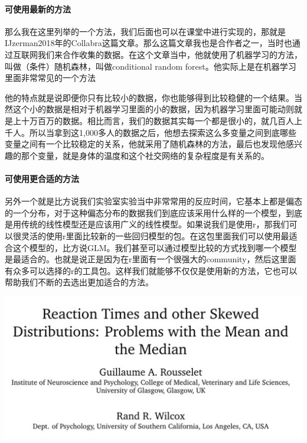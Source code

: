\documentclass[
  oneside]{book}
\begin{document}
\hypertarget{ux53efux4f7fux7528ux6700ux65b0ux7684ux65b9ux6cd5}{%
\paragraph{可使用最新的方法}\label{ux53efux4f7fux7528ux6700ux65b0ux7684ux65b9ux6cd5}}

那么我在这里列举的一个方法，我们后面也可以在课堂中进行实现的，那就是IJzerman2018年的Collabra这篇文章。那么这篇文章我也是合作者之一，当时也通过互联网我们来合作收集的数据。在这个文章当中，他就使用了机器学习的方法，叫做（条件）随机森林，叫做conditional random forest。他实际上是在机器学习里面非常常见的一个方法

他的特点就是说即便你只有比较小的数据，你也能够得到比较稳健的一个结果。当然这个小的数据是相对于机器学习里面的小的数据，因为机器学习里面可能动则就是上十万百万的数据。相比而言，我们的数据其实每一个都是很小的，就几百人上千人。所以当拿到这1,000多人的数据之后，他想去探索这么多变量之间到底哪些变量之间有一个比较稳定的关系，他就采用了随机森林的方法，最后也发现他感兴趣的那个变量，就是身体的温度和这个社交网络的复杂程度是有关系的。

\hypertarget{ux53efux4f7fux7528ux66f4ux5408ux9002ux7684ux65b9ux6cd5}{%
\paragraph{可使用更合适的方法}\label{ux53efux4f7fux7528ux66f4ux5408ux9002ux7684ux65b9ux6cd5}}

另外一个就是比方说我们实验室实验当中非常常用的反应时间，它基本上都是偏态的一个分布，对于这种偏态分布的数据我们到底应该采用什么样的一个模型，到底是用传统的线性模型还是应该用广义的线性模型。如果说我们是使用r，那我们可以很灵活的使用r里面比较新的一些回归模型的包。在这包里面我们可以使用最适合这个模型的，比方说GLM。我们甚至可以通过模型比较的方式找到哪一个模型是最适合的。也就是说正是因为在r里面有一个很强大的community，然后这里面有众多可以选择的r的工具包。这样我们就能够不仅仅是使用新的方法，它也可以帮助我们不断的去选出更加适合的方法。

\includegraphics{1001-lesson1/image-20230302201236318.png}
\end{document}
